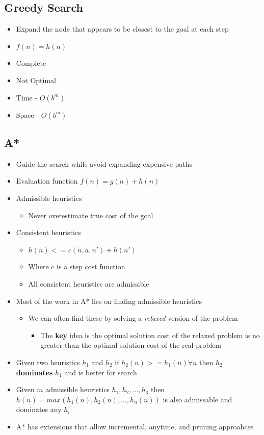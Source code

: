 \documentclass[11pt]{article}
\begin{document}
\subsection{Greedy Search}
\label{sec:orgbabcf12}
\begin{itemize}
\item Expand the node that appears to be closest to the goal at each step
\item \(f(n)=h(n)\)
\item Complete
\item Not Optimal
\item Time - \(O(b^m)\)
\item Space - \(O(b^m)\)
\end{itemize}

\subsection{A*}
\label{sec:org766b735}
\begin{itemize}
\item Guide the search while avoid expanding expensive paths
\item Evaluation function \(f(n)  = g(n) + h(n)\)
\item Admissible heuristics
\begin{itemize}
\item Never overestimate true cost of the goal
\end{itemize}
\item Consistent heuristics
\begin{itemize}
\item \(h(n) <= c(n, a, n')+h(n')\)
\item Where \(c\) is a step cost function
\item All consistent heuristics are admissible
\end{itemize}
\item Most of the work in A* lies on finding admissible heuristics
\begin{itemize}
\item We can often find these by solving a \emph{relaxed} version of the problem
\begin{itemize}
\item The \textbf{key} idea is the optimal solution cost of the relaxed problem is no greater than the optimal solution cost of the real problem
\end{itemize}
\end{itemize}
\item Given two heuristics \(h_1\) and \(h_2\) if \(h_{2}(n) >= h_{1}(n) \forall n\) then \(h_2\) \textbf{dominates} \(h_1\) and is better for search
\item Given \(m\) admissible heuristics \(h_1, h_2, \dots, h_3\) then \(h(n) = max(h_1(n), h_2(n), \dots, h_n(n))\) is also admissable and dominates any \(h_i\)
\item A* has extensions that allow incremental, anytime, and pruning approahces
\end{itemize}
\end{document}

